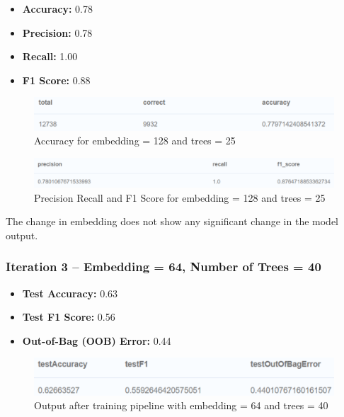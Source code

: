 \documentclass[conference, 12pt]{IEEEtran}
\begin{document}
\begin{itemize}
  \item \textbf{Accuracy:} 0.78
  \item \textbf{Precision:} 0.78
  \item \textbf{Recall:} 1.00
  \item \textbf{F1 Score:} 0.88
\end{itemize}

\begin{figure}[H]
    \centering
    \includegraphics[width=\linewidth]{images/NC_accuracy_2.png} %
    \caption{Accuracy for embedding = 128 and trees = 25}
    \label{fig:accuracy_2}
\end{figure}

\begin{figure}[H]
    \centering
    \includegraphics[width=\linewidth]{images/NC_precision_recall_f1score_2.png} %
    \caption{Precision Recall and F1 Score for embedding = 128 and trees = 25}
    \label{fig:NC_Precision_Recall_2}
\end{figure}

The change in embedding does not show any significant change in the model output.\\

\subsubsection{Iteration 3 -- Embedding = 64, Number of Trees = 40}

\begin{itemize}
  \item \textbf{Test Accuracy:} 0.63
  \item \textbf{Test F1 Score:} 0.56
  \item \textbf{Out-of-Bag (OOB) Error:} 0.44
\end{itemize}

\begin{figure}[h]
  \centering
  \includegraphics[width=\linewidth]{images/NC_model_training_output_3.png} 
  \caption{Output after training pipeline with embedding = 64 and trees = 40}
  \label{fig:classification_metrics_3}
\end{figure}
\end{document}
